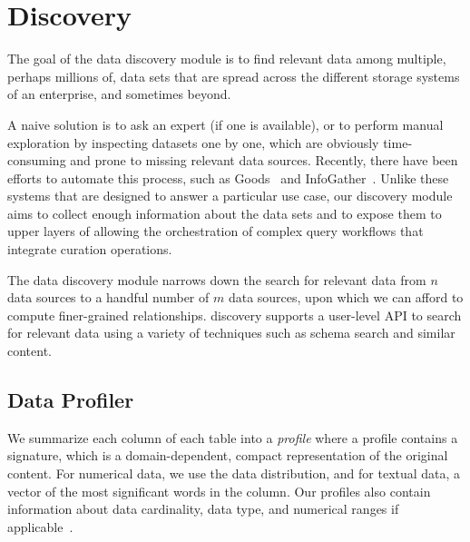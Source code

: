 \section{Discovery}
\label{sec:discovery}

The goal of the data discovery module is to find relevant data among multiple,
perhaps millions of, data sets that are spread across the different storage systems of an
enterprise, and sometimes beyond.

A naive solution is to ask an expert (if one is available), or to perform
manual exploration by inspecting datasets one by one, which are obviously
time-consuming and prone to missing relevant data sources.  
Recently, there have been efforts to automate this process, such as
Goods~\cite{DBLP:conf/sigmod/HalevyKNOPRW16} and 
InfoGather~\cite{DBLP:conf/sigmod/YakoutGCC12}. Unlike these systems
that are designed to answer a particular use case, our discovery module aims to
collect enough information about the data sets and to expose them to upper layers
of \dcv allowing the orchestration of complex query workflows that integrate curation operations.

The data discovery module narrows down the search for relevant data from
$n$ data sources to a handful number of $m$ data sources, upon which we can afford to compute finer-grained relationships.
\dcv discovery supports a user-level API to search for relevant data using a
variety of techniques such as schema search and similar content. 

\subsection{Data Profiler}

We summarize each column of each table into a {\em profile}
where a profile contains a signature, which is a domain-dependent,
compact representation of the original content.  For numerical data, we use the
data distribution, and for textual data,  a vector of the most significant words
in the column.  Our profiles also contain information about data cardinality,
data type, and numerical ranges if applicable~\cite{profiling_survey}.


